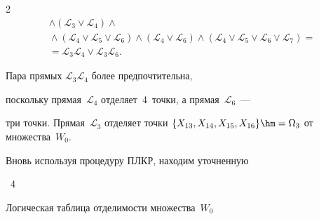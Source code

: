 \begin{multicols}{2}
\begin{multline*}
\wedge (\mathcal{ L}_3 \vee \mathcal{ L}_4)\wedge {}\\


{}\wedge (\mathcal{ L}_4 \vee \mathcal{ L}_5 \vee \mathcal{ L}_6)\wedge 


 (\mathcal{ L}_4 \vee \mathcal{ L}_6)\wedge (\mathcal{ L}_4 


 \vee \mathcal{ L}_5\vee \mathcal{ L}_6\vee \mathcal{ L}_7)={}\\


{} =\mathcal{ L}_3\mathcal{ L}_4 \vee \mathcal{ L}_3\mathcal{ L}_6.


\end{multline*}





\vspace*{-2pt}





Пара прямых $\mathcal{ L}_3\mathcal{ L}_4$ более предпочтительна, 


поскольку прямая~$\mathcal{ L}_4$ отделяет~4~точки, а прямая~$\mathcal{ L}_6$~--- 


три точки. Прямая~$\mathcal{ L}_3$ отделяет точки $\{X_{13}, X_{14}, 


X_{15}, X_{16}\} \hm=\Omega_3$ от множества~$W_0$. 


Вновь используя процедуру ПЛКР, находим уточненную\linebreak\vspace*{-12pt}





\pagebreak








{ \begin{center}  %


 


\noindent


\parbox{70mm}{{{\tablename~4}\ \ \small{


Логическая таблица отделимости множества~$W_0$


}}}


\end{center}}





{\small %


\begin{center}



\end{center}}
\end{multicols}
